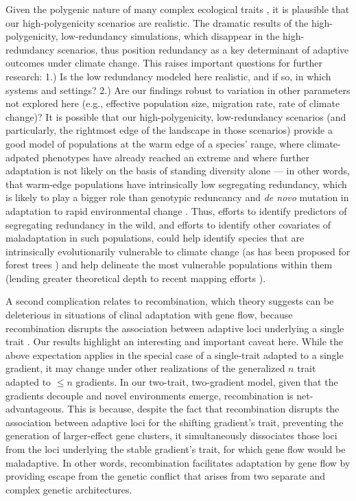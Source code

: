 \documentclass[9pt,twocolumn,twoside,lineno]{pnas-new}
\begin{document}
Given the polygenic nature of many complex ecological traits \cite{barghi_polygenic,boyle,rockman,savolainen,sella},
it is plausible that our high-polygenicity scenarios are realistic.
The dramatic results of the high-polygenicity, low-redundancy simulations,
which disappear in the high-redundancy scenarios,
thus position redundancy as a key determinant
of adaptive outcomes under climate change.
This raises important questions for further research:
1.) Is the low redundancy modeled here realistic, and if so, in which systems and settings?
2.) Are our findings robust to variation in other parameters
not explored here (e.g., effective population size, migration rate, rate of climate change)? 
It is possible that our high-polygenicity, low-redundancy scenarios
(and particularly, the rightmost edge of the landscape in those scenarios)
provide a good model of populations
at the warm edge of a species' range, where climate-adpated phenotypes have already
reached an extreme and where further adaptation is not likely
on the basis of standing diversity alone --- in other words, that warm-edge
populations have intrinsically low segregating redundancy,
which is likely to play a bigger role than genotypic reduncancy and \textit{de novo} mutation
in adaptation to rapid environmental change \cite{laruson}.
Thus, efforts to identify predictors of segregating redundancy in the wild,
and efforts to identify other covariates of maladaptation in such populations,
could help identify species that are intrinsically evolutionarily vulnerable to climate change
(as has been proposed for forest trees \cite{lind,aitken_yeaman})
and help delineate the most vulnerable populations within them
(lending greater theoretical depth to recent mapping efforts \cite{bay,gougherty}).

A second complication relates to recombination,
which theory suggests can be deleterious
in situations of clinal adaptation
with gene flow, because recombination disrupts the association between adaptive loci 
underlying a single trait \cite{tigano}.
Our results highlight an interesting and important caveat here.
While the above expectation applies in the special case of a single-trait 
adapted to a single gradient,
it may change under other realizations of the 
generalized $n$ trait adapted to $\leq n$ gradients.
In our two-trait, two-gradient model, given that the gradients decouple
and novel environments emerge,
recombination is net-advantageous.
This is because, despite the fact that recombination disrupts the association between
adaptive loci for the shifting gradient's trait, preventing the
generation of larger-effect gene clusters,
it simultaneously dissociates those loci from the loci underlying
the stable gradient's trait, for which gene flow would be maladaptive.
In other words, recombination facilitates adaptation by gene flow
by providing escape from the genetic conflict that arises
from two separate and complex genetic architectures.
   
\end{document}
